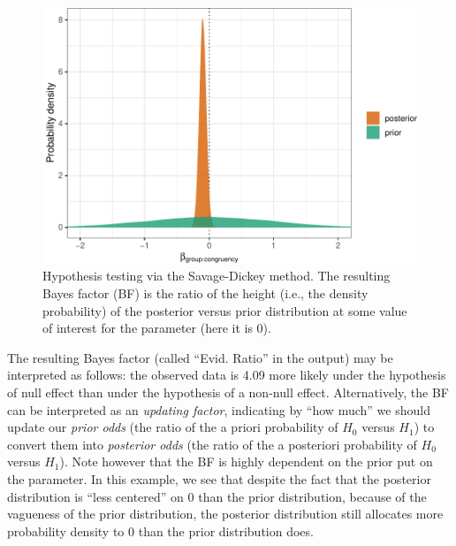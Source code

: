 \documentclass[
  11pt,
  english,
  ,doc,floatsintext]{apa6}
\begin{document}
\begin{figure}[!htb]

{\centering \includegraphics[width=0.75\linewidth]{supplementary_materials_files/figure-latex/hypothesis1-1} 

}

\caption{Hypothesis testing via the Savage-Dickey method. The resulting Bayes factor (BF) is the ratio of the height (i.e., the density probability) of the posterior versus prior distribution at some value of interest for the parameter (here it is 0).}\label{fig:hypothesis1}
\end{figure}

The resulting Bayes factor (called ``Evid. Ratio'' in the output) may be interpreted as follows: the observed data is 4.09 more likely under the hypothesis of null effect than under the hypothesis of a non-null effect. Alternatively, the BF can be interpreted as an \emph{updating factor}, indicating by ``how much'' we should update our \emph{prior odds} (the ratio of the a priori probability of \(H_{0}\) versus \(H_{1}\)) to convert them into \emph{posterior odds} (the ratio of the a posteriori probability of \(H_{0}\) versus \(H_{1}\)). Note however that the BF is highly dependent on the prior put on the parameter. In this example, we see that despite the fact that the posterior distribution is ``less centered'' on 0 than the prior distribution, because of the vagueness of the prior distribution, the posterior distribution still allocates more probability density to 0 than the prior distribution does.
\end{document}
